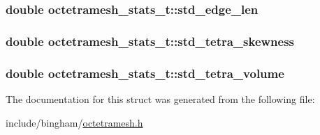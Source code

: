 \label{structoctetramesh__stats__t_aff5d5db9a58aed02ea181ea8ea427194}
\hypertarget{structoctetramesh__stats__t_a85257916d394fbdf90eabb1d302e3f26}{
\subsubsection[{std\_\-edge\_\-len}]{\setlength{\rightskip}{0pt plus 5cm}double {\bf octetramesh\_\-stats\_\-t::std\_\-edge\_\-len}}}
\label{structoctetramesh__stats__t_a85257916d394fbdf90eabb1d302e3f26}
\hypertarget{structoctetramesh__stats__t_a672abad586d95e7b1fb17f75ea9c383e}{
\subsubsection[{std\_\-tetra\_\-skewness}]{\setlength{\rightskip}{0pt plus 5cm}double {\bf octetramesh\_\-stats\_\-t::std\_\-tetra\_\-skewness}}}
\label{structoctetramesh__stats__t_a672abad586d95e7b1fb17f75ea9c383e}
\hypertarget{structoctetramesh__stats__t_aed7222523a5549a19e64be1ba55cbf96}{
\subsubsection[{std\_\-tetra\_\-volume}]{\setlength{\rightskip}{0pt plus 5cm}double {\bf octetramesh\_\-stats\_\-t::std\_\-tetra\_\-volume}}}
\label{structoctetramesh__stats__t_aed7222523a5549a19e64be1ba55cbf96}


The documentation for this struct was generated from the following file:\begin{DoxyCompactItemize}
\item 
include/bingham/\hyperlink{octetramesh_8h}{octetramesh.h}\end{DoxyCompactItemize}
